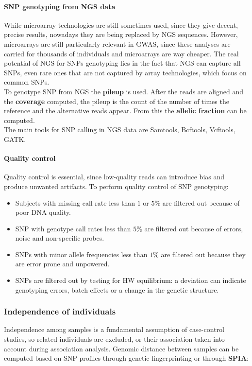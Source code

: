 			\paragraph{SNP genotyping from NGS data}
			While microarray technologies are still sometimes used, since they give decent, precise results, nowadays they are being replaced by NGS sequences. 
			However, microarrays are still particularly relevant in GWAS, since these analyses are carried for thousands of individuals and microarrays are way cheaper. 
			The real potential of NGS for SNPs genotyping lies in the fact that NGS can capture all SNPs, even rare ones that are not captured by array technologies, which focus on common SNPs. 			\\
			To genotype SNP from NGS the \textbf{pileup} is used.
			After the reads are aligned and the \textbf{coverage} computed, the pileup is the count of the number of times the reference and the alternative reads appear.
			From this the \textbf{allelic fraction} can be computed.
			\\
			The main tools for SNP calling in NGS data are Samtools, Bcftools, Vcftools, GATK.

			\paragraph{Quality control}
			Quality control is essential, since low-quality reads can introduce bias and produce unwanted artifacts.
			To perform quality control of SNP genotyping:

			\begin{multicols}{2}
				\begin{itemize}
					\item Subjects with missing call rate less than $1$ or $5\%$ are filtered out because of poor DNA quality.
					\item SNP with genotype call rates less than $5\%$ are filtered out because of errors, noise and non-specific probes.
					\item SNPs with minor allele frequencies less than $1\%$ are filtered out because they are error prone and unpowered.
					\item SNPs are filtered out by testing for HW equilibrium: a deviation can indicate genotyping errors, batch effects or a change in the genetic structure.
				\end{itemize}
			\end{multicols}

		\subsubsection{Independence of individuals}
		Independence among samples is a fundamental assumption of case-control studies, so related individuals are excluded, or their association taken into account during association analysis.
		Genomic distance between samples can be computed based on SNP profiles through genetic fingerprinting or through \textbf{SPIA}:

